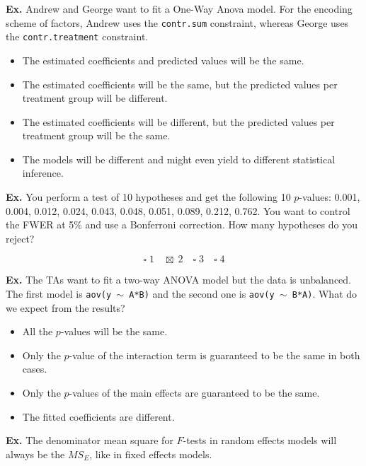 \hrulefill

\textbf{Ex.} Andrew and George want to fit a One-Way Anova model. For the encoding scheme of factors, Andrew uses the \texttt{contr.sum} constraint, whereas George uses the \texttt{contr.treatment} constraint. 

\begin{itemize}
	\item[$\square$] The estimated coefficients and predicted values will be the same.
	\item[$\square$] The estimated coefficients will be the same, but the predicted values per treatment group will be different.
	\item[$\boxtimes$] The estimated coefficients will be different, but the predicted values per treatment group will be the same.
	\item[$\square$] The models will be different and might even yield to different statistical inference.
\end{itemize}


\hrulefill

\textbf{Ex.} You perform a test of 10 hypotheses and get the following 10 $p$-values: 0.001,   0.004,   0.012,   0.024,   0.043,   0.048,   0.051,   0.089,   0.212,   0.762. You want to control the FWER at 5\% and use a Bonferroni correction. How many hypotheses do you reject?

$$\square \; 1 \quad \boxtimes \; 2 \quad \square \; 3 \quad \square \; 4 $$


\hrulefill

\textbf{Ex.} The TAs want to fit a two-way ANOVA model but the data is unbalanced. The first model is \texttt{aov(y $\sim$ A*B)} and the second one is \texttt{aov(y $\sim$ B*A)}. What do we expect from the results?

\begin{itemize}
	\item[$\square$] All the $p$-values will be the same.
	\item[$\boxtimes$] Only the $p$-value of the interaction term is guaranteed to be the same in both cases.
	\item[$\square$] Only the $p$-values of the main effects are guaranteed to be the same.
	\item[$\square$] The fitted coefficients are different.
\end{itemize}


\hrulefill

\textbf{Ex.} The denominator mean square for $F$-tests in random effects models will always be the $MS_E$, like in fixed effects models.

